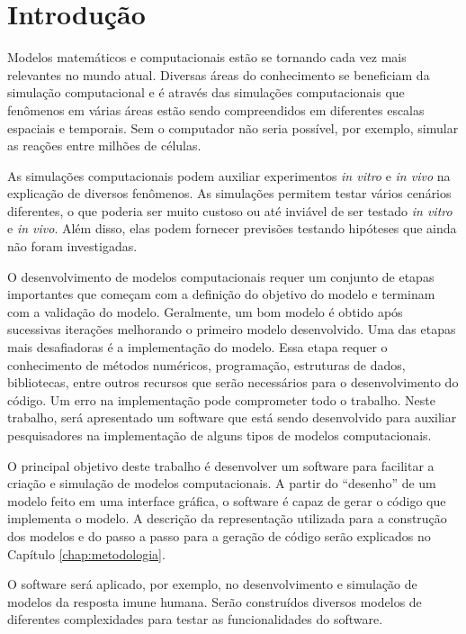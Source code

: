 \documentclass[
	12pt,				%
	openright,			%
	oneside,			%
	a4paper,			%
	main=brazil,
	english,			%
	]{ufsj-abntex2}
\begin{document}
\chapter{Introdução}

Modelos matemáticos e computacionais estão se tornando cada vez mais relevantes no mundo atual. Diversas áreas do conhecimento se beneficiam da simulação computacional e é através das simulações computacionais que fenômenos em várias áreas estão sendo compreendidos em diferentes escalas espaciais e temporais. Sem o computador não seria possível, por exemplo, simular as reações entre milhões de células. 

As simulações computacionais podem auxiliar experimentos \textit{in vitro} e \textit{in vivo} na explicação de diversos fenômenos. As simulações permitem testar vários cenários diferentes, o que poderia ser muito custoso ou até inviável de ser testado \textit{in vitro} e \textit{in vivo}. Além disso, elas podem fornecer previsões testando hipóteses que ainda não foram investigadas. 

O desenvolvimento de modelos computacionais requer um conjunto de etapas importantes que começam com a definição do objetivo do modelo e terminam com a validação do modelo. Geralmente, um bom modelo é obtido após sucessivas iterações melhorando o primeiro modelo desenvolvido. Uma das etapas mais desafiadoras é a implementação do modelo. Essa etapa requer o conhecimento de métodos numéricos, programação, estruturas de dados, bibliotecas, entre outros recursos que serão necessários para o desenvolvimento do código. Um erro na implementação pode comprometer todo o trabalho. Neste trabalho, será apresentado um software que está sendo desenvolvido para auxiliar pesquisadores na implementação de alguns tipos de modelos computacionais. 

O principal objetivo deste trabalho é desenvolver um software para facilitar a criação e simulação de modelos computacionais. A partir do ``desenho'' de um modelo feito em uma interface gráfica, o software é capaz de gerar o código que implementa o modelo. A descrição da representação utilizada para a construção dos modelos e do passo a passo para a geração de código serão explicados no Capítulo \ref{chap:metodologia}. 

O software será aplicado, por exemplo, no desenvolvimento e simulação de modelos da resposta imune humana. Serão construídos diversos modelos de diferentes complexidades para testar as funcionalidades do software.  
\end{document}
